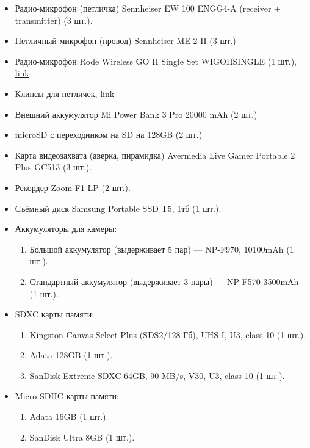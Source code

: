 \begin{itemize}[noitemsep]
  \item Радио-микрофон (петличка) {\small\textsf{Sennheiser EW 100 ENGG4-A (receiver + transmitter)}} (3 шт.).
  \item Петличный микрофон (провод) \textsf{Sennheiser ME 2-II} (3 шт.)
  \item Радио-микрофон \textsf{Rode Wireless GO II Single Set WIGOIISINGLE} (1 шт.), \href{https://tehnozum.ru/catalog/komplekt-mikrofonov-rode-wireless-go-ii-single-set-wigoiisingle/}{link}
  \item Клипсы для петличек, \href{https://pixel24.ru/catalog/view/id/47095}{link}
  \item Внешний аккумулятор \textsf{Mi Power Bank 3 Pro 20000 mAh} (2 шт.)
  \item microSD с переходником на SD на 128GB (2 шт.)
  \item Карта видеозахвата (аверка, пирамидка) \textsf{Avermedia Live Gamer Portable 2 Plus GC513} (3 шт.).
  \item Рекордер \textsf{Zoom F1-LP} (2 шт.).
  \item Съёмный диск \textsf{Samsung Portable SSD T5}, 1тб (1 шт.).

  \item Аккумуляторы для камеры:
        \begin{enumerate}
          \item Большой аккумулятор (выдерживает 5 пар) --- \textsf{NP-F970, 10100mAh} (1 шт.).
          \item Стандартный аккумулятор (выдерживает 3 пары) --- \textsf{NP-F570 3500mAh} (1 шт.).
        \end{enumerate}\vspace{0.4\baselineskip}

  \item \textsf{SDXC} карты памяти:
        \begin{enumerate}
          \item \textsf{Kingston Canvas Select Plus (SDS2/128 Гб), UHS-I, U3, class 10} (1 шт.).
          \item \textsf{Adata 128GB} (1 шт.).
          \item \textsf{SanDisk Extreme SDXC 64GB, 90 MB/s, V30, U3, class 10} (1 шт.).
        \end{enumerate}\vspace{0.4\baselineskip}

  \item \textsf{Micro SDHC} карты памяти:
        \begin{enumerate}
          \item \textsf{Adata 16GB} (1 шт.).
          \item \textsf{SanDisk Ultra 8GB} (1 шт.).
        \end{enumerate}\vspace{0.4\baselineskip}


\end{itemize}
